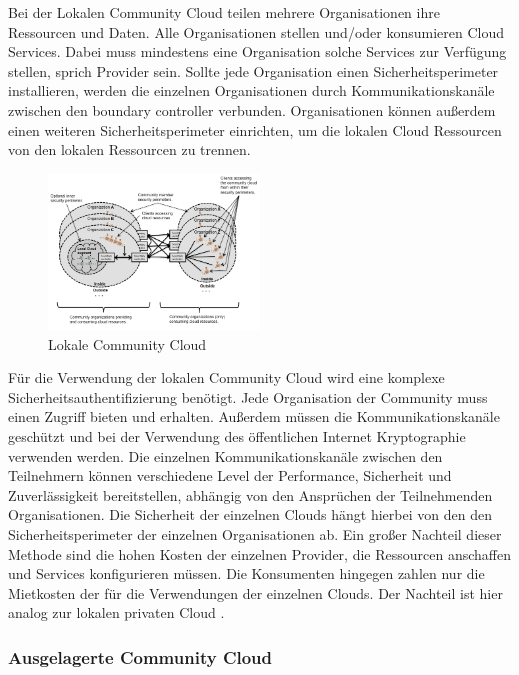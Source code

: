 Bei der Lokalen Community Cloud teilen mehrere Organisationen ihre Ressourcen und Daten. Alle Organisationen stellen und/oder konsumieren Cloud Services.
Dabei muss mindestens eine Organisation solche Services zur Verfügung stellen, sprich Provider sein.
Sollte jede Organisation einen Sicherheitsperimeter installieren, werden die einzelnen Organisationen durch Kommunikationskanäle zwischen den \glqq boundary controller\grqq{}{}{}{} verbunden.
Organisationen können außerdem einen weiteren Sicherheitsperimeter einrichten, um die lokalen Cloud Ressourcen von den lokalen Ressourcen zu trennen.
\begin{figure}[h]
    \centering
	\includegraphics[width=0.5\textwidth]{Images/On-siteCommunityCloud}
	\caption{Lokale Community Cloud \cite{Badger}}
	\label{On-siteCommunityCloud}
\end{figure}
Für die Verwendung der lokalen Community Cloud wird eine komplexe Sicherheitsauthentifizierung benötigt. Jede Organisation der Community muss einen Zugriff bieten und erhalten.
Außerdem müssen die Kommunikationskanäle geschützt und bei der Verwendung des öffentlichen Internet Kryptographie verwenden werden. Die einzelnen Kommunikationskanäle zwischen den Teilnehmern 
können verschiedene Level der Performance, Sicherheit und Zuverlässigkeit bereitstellen, abhängig von den Ansprüchen der Teilnehmenden Organisationen. Die Sicherheit der einzelnen Clouds hängt 
hierbei von den den Sicherheitsperimeter der einzelnen Organisationen ab. Ein großer Nachteil dieser Methode sind die hohen Kosten der einzelnen Provider, die Ressourcen 
anschaffen und Services konfigurieren müssen. Die Konsumenten hingegen zahlen nur die Mietkosten der für die Verwendungen der einzelnen Clouds. Der Nachteil ist hier analog zur lokalen privaten Cloud \cite{Badger}.

\subsubsection{Ausgelagerte Community Cloud}

